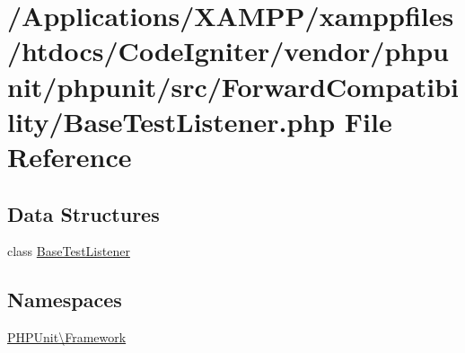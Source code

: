 \hypertarget{_forward_compatibility_2_base_test_listener_8php}{}\section{/\+Applications/\+X\+A\+M\+P\+P/xamppfiles/htdocs/\+Code\+Igniter/vendor/phpunit/phpunit/src/\+Forward\+Compatibility/\+Base\+Test\+Listener.php File Reference}
\label{_forward_compatibility_2_base_test_listener_8php}
\subsection*{Data Structures}
\begin{DoxyCompactItemize}
\item 
class \mbox{\hyperlink{class_p_h_p_unit_1_1_framework_1_1_base_test_listener}{Base\+Test\+Listener}}
\end{DoxyCompactItemize}
\subsection*{Namespaces}
\begin{DoxyCompactItemize}
\item 
 \mbox{\hyperlink{namespace_p_h_p_unit_1_1_framework}{P\+H\+P\+Unit\textbackslash{}\+Framework}}
\end{DoxyCompactItemize}
